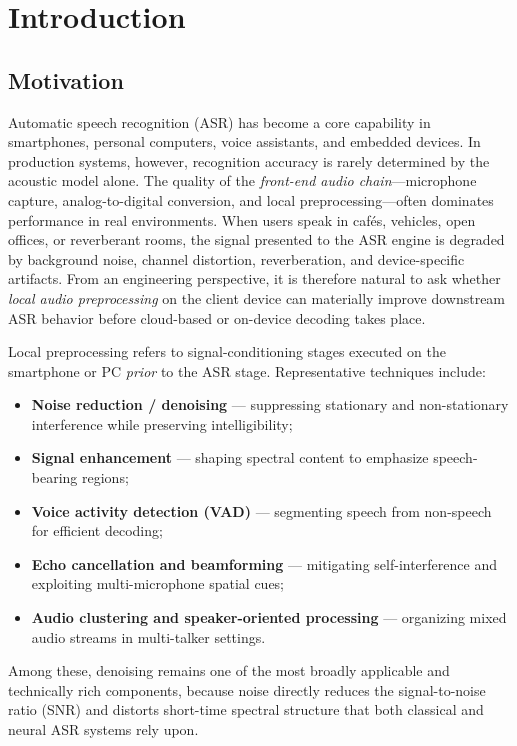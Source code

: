 \chapter{Introduction}
\label{ch:introduction}

\section{Motivation}
\label{sec:motivation}

Automatic speech recognition (ASR) has become a core capability in smartphones, personal computers, voice assistants, and embedded devices. In production systems, however, recognition accuracy is rarely determined by the acoustic model alone. The quality of the \emph{front-end audio chain}---microphone capture, analog-to-digital conversion, and local preprocessing---often dominates performance in real environments. When users speak in cafés, vehicles, open offices, or reverberant rooms, the signal presented to the ASR engine is degraded by background noise, channel distortion, reverberation, and device-specific artifacts. From an engineering perspective, it is therefore natural to ask whether \emph{local audio preprocessing} on the client device can materially improve downstream ASR behavior before cloud-based or on-device decoding takes place.

Local preprocessing refers to signal-conditioning stages executed on the smartphone or PC \emph{prior} to the ASR stage. Representative techniques include:
\begin{itemize}
  \item \textbf{Noise reduction / denoising} --- suppressing stationary and non-stationary interference while preserving intelligibility;
  \item \textbf{Signal enhancement} --- shaping spectral content to emphasize speech-bearing regions;
  \item \textbf{Voice activity detection (VAD)} --- segmenting speech from non-speech for efficient decoding;
  \item \textbf{Echo cancellation and beamforming} --- mitigating self-interference and exploiting multi-microphone spatial cues;
  \item \textbf{Audio clustering and speaker-oriented processing} --- organizing mixed audio streams in multi-talker settings.
\end{itemize}
Among these, denoising remains one of the most broadly applicable and technically rich components, because noise directly reduces the signal-to-noise ratio (SNR) and distorts short-time spectral structure that both classical and neural ASR systems rely upon.

